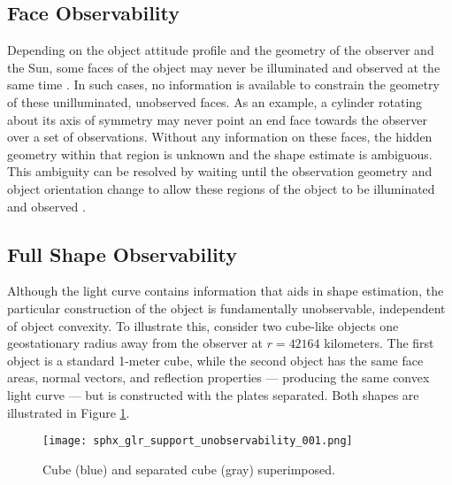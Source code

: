 \subsection{Face Observability}

Depending on the object attitude profile and the geometry of the observer and the Sun, some faces of the object may never be illuminated and observed at the same time \cite{fan2020thesis}. In such cases, no information is available to constrain the geometry of these unilluminated, unobserved faces. As an example, a cylinder rotating about its axis of symmetry may never point an end face towards the observer over a set of observations. Without any information on these faces, the hidden geometry within that region is unknown and the shape estimate is ambiguous. This ambiguity can be resolved by waiting until the observation geometry and object orientation change to allow these regions of the object to be illuminated and observed \cite{friedman2020}. 


\subsection{Full Shape Observability} \label{sec:full_shape}

Although the light curve contains information that aids in shape estimation, the particular construction of the object is fundamentally unobservable, independent of object convexity. To illustrate this, consider two cube-like objects one geostationary radius away from the observer at $r=42164$ kilometers. The first object is a standard 1-meter cube, while the second object has the same face areas, normal vectors, and reflection properties --- producing the same convex light curve --- but is constructed with the plates separated. Both shapes are illustrated in Figure \ref{fig:shape_amb_shapes}.

\begin{figure}[!htb]
  \centering
  \texttt{[image: sphx\_glr\_support\_unobservability\_001.png]}
  \caption{Cube (blue) and separated cube (gray) superimposed.}
  \label{fig:shape_amb_shapes}
\end{figure}

